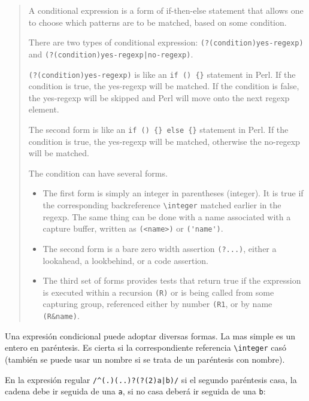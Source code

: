 \begin{it}
\begin{quotation}
A conditional expression is a form of if-then-else
statement that allows one to choose which patterns are
to be matched, based on some condition. 

There are two
types of conditional expression: \verb#(?(condition)yes-regexp)# and
\verb#(?(condition)yes-regexp|no-regexp)#. 

\verb#(?(condition)yes-regexp)# is like an
\verb'if () {}' statement in Perl. 
If the condition is true, the yes-regexp
will be matched. If the condition is false, the yes-regexp will be
skipped and Perl will move onto the next regexp element. 

The second form
is like an \verb'if () {} else {}' statement in Perl. If the condition is true,
the yes-regexp will be matched, otherwise the no-regexp will be matched.

The condition can have several forms. 
\begin{itemize}
\item The first form is simply an
integer in parentheses (integer). It is true if the corresponding
backreference \verb|\integer| matched earlier in the regexp. The same thing
can be done with a name associated with a capture buffer, written as
\verb|(<name>)| or \verb#('name')#. 
\item
The second form is a bare zero width assertion
\verb|(?...)|, either a lookahead, a lookbehind, or a code assertion. 

\item
The third set of forms provides tests that return
true if the expression is executed within a recursion \verb|(R)| or is being
called from some capturing group, referenced either by number \verb|(R1|,
or by name \verb#(R&name)#.
\end{itemize}
\end{quotation}
\end{it}


Una expresión condicional puede adoptar diversas formas.
La mas simple es un entero en paréntesis. 
Es cierta si la correspondiente referencia 
\verb|\integer| casó (también se puede usar un nombre
si se trata de un paréntesis con nombre). 

En la expresión regular \verb#/^(.)(..)?(?(2)a|b)/# si el segundo paréntesis
casa, la cadena debe ir seguida de una \verb|a|, si no casa deberá ir seguida de 
una \verb|b|: 


